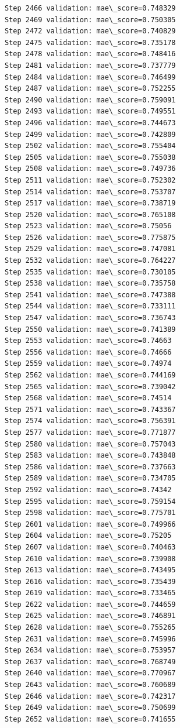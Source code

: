 \documentclass[11pt]{article}
\begin{document}
\begin{Verbatim}[commandchars=\\\{\}]
Step 2466 validation: mae\_score=0.748329
Step 2469 validation: mae\_score=0.750305
Step 2472 validation: mae\_score=0.740829
Step 2475 validation: mae\_score=0.735178
Step 2478 validation: mae\_score=0.748416
Step 2481 validation: mae\_score=0.737779
Step 2484 validation: mae\_score=0.746499
Step 2487 validation: mae\_score=0.752255
Step 2490 validation: mae\_score=0.759091
Step 2493 validation: mae\_score=0.749551
Step 2496 validation: mae\_score=0.744673
Step 2499 validation: mae\_score=0.742809
Step 2502 validation: mae\_score=0.755404
Step 2505 validation: mae\_score=0.755038
Step 2508 validation: mae\_score=0.749736
Step 2511 validation: mae\_score=0.752302
Step 2514 validation: mae\_score=0.753707
Step 2517 validation: mae\_score=0.738719
Step 2520 validation: mae\_score=0.765108
Step 2523 validation: mae\_score=0.75056
Step 2526 validation: mae\_score=0.775875
Step 2529 validation: mae\_score=0.747081
Step 2532 validation: mae\_score=0.764227
Step 2535 validation: mae\_score=0.730105
Step 2538 validation: mae\_score=0.735758
Step 2541 validation: mae\_score=0.747388
Step 2544 validation: mae\_score=0.733111
Step 2547 validation: mae\_score=0.736743
Step 2550 validation: mae\_score=0.741389
Step 2553 validation: mae\_score=0.74663
Step 2556 validation: mae\_score=0.74666
Step 2559 validation: mae\_score=0.74974
Step 2562 validation: mae\_score=0.744169
Step 2565 validation: mae\_score=0.739042
Step 2568 validation: mae\_score=0.74514
Step 2571 validation: mae\_score=0.743367
Step 2574 validation: mae\_score=0.756391
Step 2577 validation: mae\_score=0.771877
Step 2580 validation: mae\_score=0.757043
Step 2583 validation: mae\_score=0.743848
Step 2586 validation: mae\_score=0.737663
Step 2589 validation: mae\_score=0.734705
Step 2592 validation: mae\_score=0.74342
Step 2595 validation: mae\_score=0.759154
Step 2598 validation: mae\_score=0.775701
Step 2601 validation: mae\_score=0.749966
Step 2604 validation: mae\_score=0.75205
Step 2607 validation: mae\_score=0.740463
Step 2610 validation: mae\_score=0.739908
Step 2613 validation: mae\_score=0.743495
Step 2616 validation: mae\_score=0.735439
Step 2619 validation: mae\_score=0.733465
Step 2622 validation: mae\_score=0.744659
Step 2625 validation: mae\_score=0.746891
Step 2628 validation: mae\_score=0.755265
Step 2631 validation: mae\_score=0.745996
Step 2634 validation: mae\_score=0.753957
Step 2637 validation: mae\_score=0.768749
Step 2640 validation: mae\_score=0.770967
Step 2643 validation: mae\_score=0.760689
Step 2646 validation: mae\_score=0.742317
Step 2649 validation: mae\_score=0.750699
Step 2652 validation: mae\_score=0.741655

\end{Verbatim}
\end{document}

